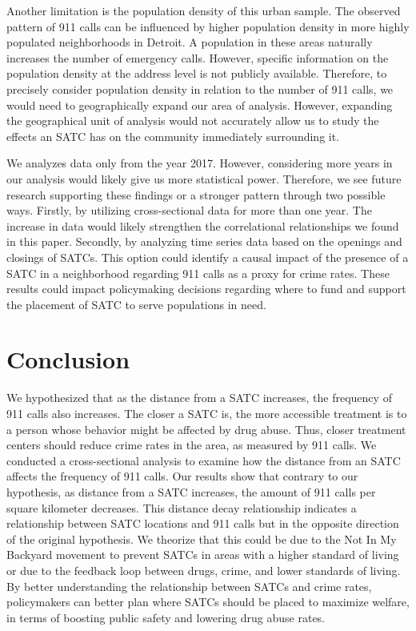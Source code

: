 \documentclass[12pt]{article}
\begin{document}
Another limitation is the population density of this urban sample. The observed pattern of 911 calls can be influenced by higher population density in more highly populated neighborhoods in Detroit. A population in these areas naturally increases the number of emergency calls. However, specific information on the population density at the address level is not publicly available. Therefore, to precisely consider population density in relation to the number of 911 calls, we would need to geographically expand our area of analysis. However, expanding the geographical unit of analysis would not accurately allow us to study the effects an SATC has on the community immediately surrounding it. 

We analyzes data only from the year 2017. However, considering more years in our analysis would likely give us more statistical power. Therefore, we see future research supporting these findings or a stronger pattern through two possible ways. Firstly, by utilizing cross-sectional data for more than one year. The increase in data would likely strengthen the correlational relationships we found in this paper. Secondly, by analyzing time series data based on the openings and closings of SATCs. This option could identify a causal impact of the presence of a SATC in a neighborhood regarding 911 calls as a proxy for crime rates. These results could impact policymaking decisions regarding where to fund and support the placement of SATC to serve populations in need. 



\section{Conclusion}
\label{sec:conclusion}


We hypothesized that as the distance from a SATC increases, the frequency of 911 calls also increases. The closer a SATC is, the more accessible treatment is to a person whose behavior might be affected by drug abuse. Thus, closer treatment centers should reduce crime rates in the area, as measured by 911 calls. We conducted a cross-sectional analysis to examine how the distance from an SATC affects the frequency of 911 calls. Our results show that contrary to our hypothesis, as distance from a SATC increases, the amount of 911 calls per square kilometer decreases. This distance decay relationship indicates a relationship between SATC locations and 911 calls but in the opposite direction of the original hypothesis. We theorize that this could be due to the Not In My Backyard movement to prevent SATCs in areas with a higher standard of living or due to the feedback loop between drugs, crime, and lower standards of living. By better understanding the relationship between SATCs and crime rates, policymakers can better plan where SATCs should be placed to maximize welfare, in terms of boosting public safety and lowering drug abuse rates. 
\end{document}
